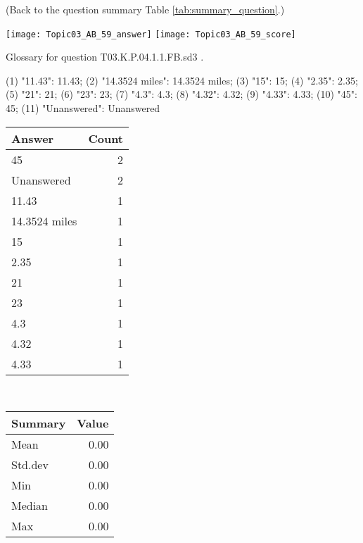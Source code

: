 \documentclass[12pt,english,nohyper]{tufte-handout}\usepackage[]{graphicx}\usepackage[]{color}
\begin{document}
 (Back to the question summary Table \ref{tab:summary_question}.)

\begin{center} \texttt{[image: Topic03\_AB\_59\_answer]} \texttt{[image: Topic03\_AB\_59\_score]} \end{center} 

Glossary for question T03.K.P.04.1.1.FB.sd3 .

(1) "11.43": 11.43; (2) "14.3524 miles": 14.3524 miles; (3) "15": 15; (4) "2.35": 2.35; (5) "21": 21; (6) "23": 23; (7) "4.3": 4.3; (8) "4.32": 4.32; (9) "4.33": 4.33; (10) "45": 45; (11) "Unanswered": Unanswered

\begin{center}%
\begin{tabular}{lr}
  \hline
Answer & Count \\ 
  \hline
45 &   2 \\ 
  Unanswered &   2 \\ 
  11.43 &   1 \\ 
  14.3524 miles &   1 \\ 
  15 &   1 \\ 
  2.35 &   1 \\ 
  21 &   1 \\ 
  23 &   1 \\ 
  4.3 &   1 \\ 
  4.32 &   1 \\ 
  4.33 &   1 \\ 
   \hline
\end{tabular}
~~~~~~~~%
\begin{tabular}{lr}
  \hline
Summary & Value \\ 
  \hline
Mean & 0.00 \\ 
  Std.dev & 0.00 \\ 
  Min & 0.00 \\ 
  Median & 0.00 \\ 
  Max & 0.00 \\ 
   \hline
\end{tabular}
\end{center}\newpage{}
\end{document}

